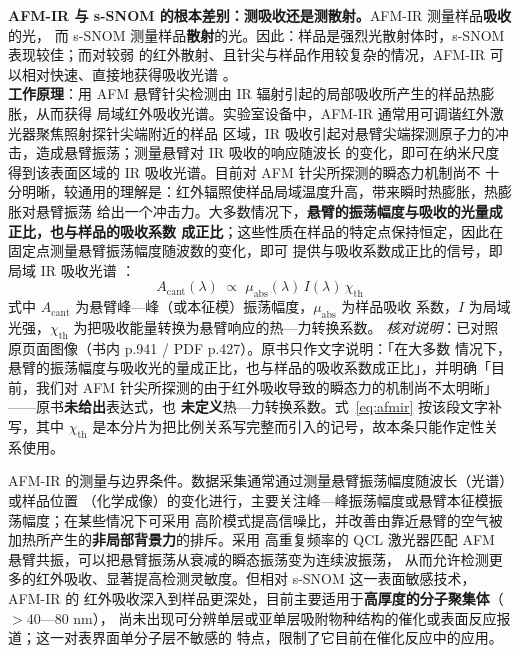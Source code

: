 \begin{principle}
\textbf{AFM-IR 与 s-SNOM 的根本差别：测吸收还是测散射。}AFM-IR 测量样品\textbf{吸收}的光，
而 s-SNOM 测量样品\textbf{散射}的光。因此：样品是强烈光散射体时，s-SNOM 表现较佳；而对较弱
的红外散射、且针尖与样品作用较复杂的情况，AFM-IR 可以相对快速、直接地获得吸收光谱
。\\
\textbf{工作原理}：用 AFM 悬臂针尖检测由 IR 辐射引起的局部吸收所产生的样品热膨胀，从而获得
局域红外吸收光谱。实验室设备中，AFM-IR 通常用可调谐红外激光器聚焦照射探针尖端附近的样品
区域，IR 吸收引起对悬臂尖端探测原子力的冲击，造成悬臂振荡；测量悬臂对 IR 吸收的响应随波长
的变化，即可在纳米尺度得到该表面区域的 IR 吸收光谱。目前对 AFM 针尖所探测的瞬态力机制尚不
十分明晰，较通用的理解是：红外辐照使样品局域温度升高，带来瞬时热膨胀，热膨胀对悬臂振荡
给出一个冲击力。大多数情况下，\textbf{悬臂的振荡幅度与吸收的光量成正比，也与样品的吸收系数
成正比}；这些性质在样品的特定点保持恒定，因此在固定点测量悬臂振荡幅度随波数的变化，即可
提供与吸收系数成正比的信号，即局域 IR 吸收光谱
：
\begin{equation}\label{eq:afmir}
A_{\mathrm{cant}}(\lambda)\;\propto\;\mu_{\mathrm{abs}}(\lambda)\,I(\lambda)\,\chi_{\mathrm{th}}
\end{equation}
式中 $A_{\mathrm{cant}}$ 为悬臂峰—峰（或本征模）振荡幅度，$\mu_{\mathrm{abs}}$ 为样品吸收
系数，$I$ 为局域光强，$\chi_{\mathrm{th}}$ 为把吸收能量转换为悬臂响应的热—力转换系数。
\emph{核对说明}：已对照原页面图像（书内 p.941 / PDF p.427）。原书只作文字说明：「在大多数
情况下，悬臂的振荡幅度与吸收光的量成正比，也与样品的吸收系数成正比」，并明确「目前，我们对
AFM 针尖所探测的由于红外吸收导致的瞬态力的机制尚不太明晰」——原书\textbf{未给出}表达式，也
\textbf{未定义}热—力转换系数。式~\eqref{eq:afmir} 按该段文字补写，其中 $\chi_{\mathrm{th}}$
是本分片为把比例关系写完整而引入的记号，故本条只能作定性关系使用。
\end{principle}

\begin{measure}
AFM-IR 的测量与边界条件。数据采集通常通过测量悬臂振荡幅度随波长（光谱）或样品位置
（化学成像）的变化进行，主要关注峰—峰振荡幅度或悬臂本征模振荡幅度；在某些情况下可采用
高阶模式提高信噪比，并改善由靠近悬臂的空气被加热所产生的\textbf{非局部背景力}的排斥。采用
高重复频率的 QCL 激光器匹配 AFM 悬臂共振，可以把悬臂振荡从衰减的瞬态振荡变为连续波振荡，
从而允许检测更多的红外吸收、显著提高检测灵敏度。但相对 s-SNOM 这一表面敏感技术，AFM-IR 的
红外吸收深入到样品更深处，目前主要适用于\textbf{高厚度的分子聚集体}（$>40$—80 nm），
尚未出现可分辨单层或亚单层吸附物种结构的催化或表面反应报道；这一对表界面单分子层不敏感的
特点，限制了它目前在催化反应中的应用。
\end{measure}

